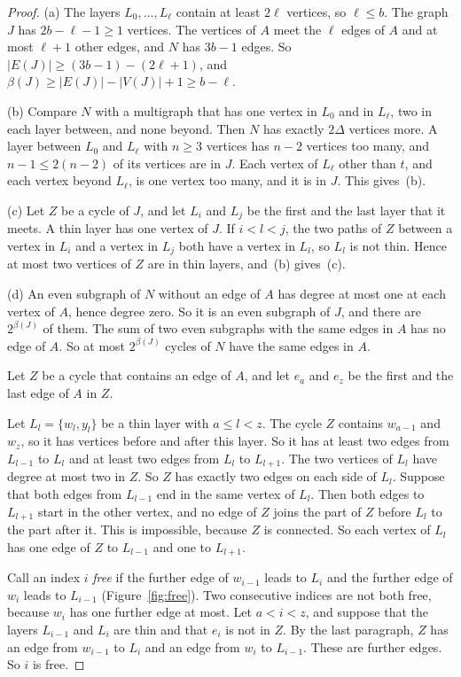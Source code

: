 \begin{proof}
(a) The layers $L_0,\dots,L_\ell$ contain at least $2\ell$ vertices, so $\ell\le b$. The graph $J$
has $2b-\ell-1\ge1$ vertices. The vertices of $A$ meet the $\ell$ edges of $A$ and at most
$\ell+1$ other edges, and $N$ has $3b-1$ edges. So $|E(J)|\ge(3b-1)-(2\ell+1)$, and
$\beta(J)\ge|E(J)|-|V(J)|+1\ge b-\ell$.

(b) Compare $N$ with a multigraph that has one vertex in $L_0$ and in $L_\ell$, two in each layer
between, and none beyond. Then $N$ has exactly $2\Delta$ vertices more. A layer between $L_0$ and
$L_\ell$ with $n\ge3$ vertices has $n-2$ vertices too many, and $n-1\le2(n-2)$ of its vertices are
in $J$. Each vertex of $L_\ell$ other than $t$, and each vertex beyond $L_\ell$, is one vertex
too many, and it is in $J$. This gives~(b).

(c) Let $Z$ be a cycle of $J$, and let $L_i$ and $L_j$ be the first and the last layer that it
meets. A thin layer has one vertex of $J$. If $i<l<j$, the two paths of $Z$ between a vertex in
$L_i$ and a vertex in $L_j$ both have a vertex in $L_l$, so $L_l$ is not thin. Hence at most two
vertices of $Z$ are in thin layers, and~(b) gives~(c).

(d) An even subgraph of $N$ without an edge of $A$ has degree at most one at each vertex of $A$,
hence degree zero. So it is an even subgraph of $J$, and there are $2^{\beta(J)}$ of them. The sum
of two even subgraphs with the same edges in $A$ has no edge of $A$. So at most $2^{\beta(J)}$
cycles of $N$ have the same edges in $A$.

Let $Z$ be a cycle that contains an edge of $A$, and let $e_a$ and $e_z$ be the first and the
last edge of $A$ in $Z$.

 Let $L_l=\{w_l,y_l\}$ be a thin layer with $a\le l<z$. The cycle $Z$ contains
$w_{a-1}$ and $w_z$, so it has vertices before and after this layer. So it has at least two edges
from $L_{l-1}$ to $L_l$ and at least two edges from $L_l$ to $L_{l+1}$. The two vertices of $L_l$
have degree at most two in $Z$. So $Z$ has exactly two edges on each side of $L_l$. Suppose that
both edges from $L_{l-1}$ end in the same vertex of $L_l$. Then both edges to $L_{l+1}$ start in
the other vertex, and no edge of $Z$ joins the part of $Z$ before $L_l$ to the part after it.
This is impossible, because $Z$ is connected. So each vertex of $L_l$ has one edge of $Z$ to
$L_{l-1}$ and one to $L_{l+1}$.

 Call an index $i$ \emph{free} if the further edge of $w_{i-1}$ leads to
$L_i$ and the further edge of $w_i$ leads to $L_{i-1}$ (Figure~\ref{fig:free}). Two consecutive indices are not both
free, because $w_i$ has one further edge at most. Let $a<i<z$, and suppose that the layers
$L_{i-1}$ and $L_i$ are thin and that $e_i$ is not in $Z$. By the last paragraph, $Z$ has an edge
from $w_{i-1}$ to $L_i$ and an edge from $w_i$ to $L_{i-1}$. These are further edges. So $i$ is
free.


\end{proof}
